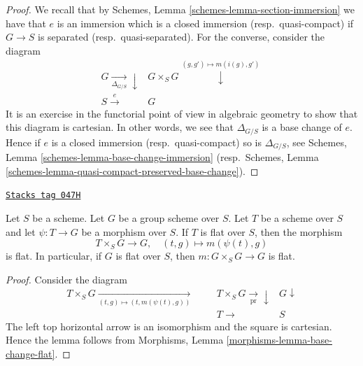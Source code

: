 \begin{proof}
We recall that by
Schemes, Lemma \ref{schemes-lemma-section-immersion}
we have that $e$ is an immersion which is a closed immersion
(resp.\ quasi-compact) if $G \to S$ is separated (resp.\ quasi-separated).
For the converse, consider the diagram
$$
\begin{array}{cc}G \underset{\Delta_{G/S}}{\longrightarrow}\downarrow & G \times_S G \overset{(g, g') \mapsto m(i(g), g')}{\downarrow} \\ S \overset{e}{\longrightarrow} & G\end{array}
$$
It is an exercise in the functorial point of view in algebraic geometry
to show that this diagram is cartesian. In other words, we see that
$\Delta_{G/S}$ is a base change of $e$. Hence if $e$ is a
closed immersion (resp.\ quasi-compact) so is $\Delta_{G/S}$, see
Schemes, Lemma \ref{schemes-lemma-base-change-immersion}
(resp.\ Schemes, Lemma
\ref{schemes-lemma-quasi-compact-preserved-base-change}).
\end{proof}

\begin{lemma}
\label{groupoids-lemma-flat-action-on-group-scheme}
\href{https://stacks.math.columbia.edu/tag/047H}{\texttt{Stacks tag 047H}}

Let $S$ be a scheme.
Let $G$ be a group scheme over $S$.
Let $T$ be a scheme over $S$ and let $\psi : T \to G$ be a morphism over $S$.
If $T$ is flat over $S$, then the morphism
$$
T \times_S G \longrightarrow G, \quad
(t, g) \longmapsto m(\psi(t), g)
$$
is flat. In particular, if $G$ is flat over $S$, then
$m : G \times_S G \to G$ is flat.
\end{lemma}

\begin{proof}
Consider the diagram
$$
\begin{array}{ccccc}T \times_S G \underset{(t, g) \mapsto (t, m(\psi(t), g))}{\longrightarrow} &  &  & T \times_S G \underset{\text{pr}}{\longrightarrow}\downarrow & G \downarrow \\  &  &  & T \longrightarrow & S\end{array}
$$
The left top horizontal arrow is an isomorphism and the
square is cartesian. Hence the lemma follows from
Morphisms, Lemma \ref{morphisms-lemma-base-change-flat}.
\end{proof}

